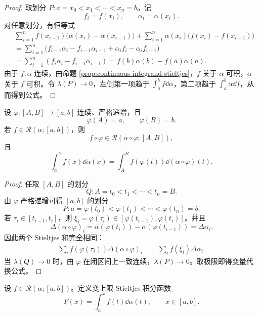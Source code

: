 \begin{proof}
	取划分 $P:a=x_0<x_1<\cdots<x_n=b$。记
	\[
	f_i=f(x_i),
	\qquad
	\alpha_i=\alpha(x_i).
	\]
	对任意划分，有恒等式
	\[
	\begin{aligned}
		&\sum_{i=1}^n f(x_{i-1})\bigl(\alpha(x_i)-\alpha(x_{i-1})\bigr)
		+\sum_{i=1}^n \alpha(x_i)\bigl(f(x_i)-f(x_{i-1})\bigr) \\
		&=\sum_{i=1}^n \bigl(f_{i-1}\alpha_i-f_{i-1}\alpha_{i-1}+\alpha_i f_i-\alpha_i f_{i-1}\bigr) \\
		&=\sum_{i=1}^n(f_i\alpha_i-f_{i-1}\alpha_{i-1})
		=f(b)\alpha(b)-f(a)\alpha(a).
	\end{aligned}
	\]
	由于 $f,\alpha$ 连续，由命题 \ref{prop:continuous-integrand-stieltjes}，$f$ 关于 $\alpha$ 可积，$\alpha$ 关于 $f$ 可积。令 $\lambda(P)\to0$，左侧第一项趋于 $\int_a^b f\dd\alpha$，第二项趋于 $\int_a^b\alpha\dd f$，从而得到公式。
\end{proof}

\begin{proposition}\label{prop:change-variable-stieltjes}
	设 $\varphi:[A,B]\to[a,b]$ 连续、严格递增，且
	\[
	\varphi(A)=a,
	\qquad
	\varphi(B)=b.
	\]
	若 $f\in\mathcal R(\alpha;[a,b])$，则
	\[
	f\circ\varphi\in\mathcal R(\alpha\circ\varphi;[A,B]),
	\]
	且
	\[
	\int_a^b f(x)\dd\alpha(x)
	=\int_A^B f(\varphi(t))\dd(\alpha\circ\varphi)(t).
	\]
\end{proposition}

\begin{proof}
	任取 $[A,B]$ 的划分
	\[
	Q:A=t_0<t_1<\cdots<t_n=B.
	\]
	由 $\varphi$ 严格递增可得 $[a,b]$ 的划分
	\[
	P:a=\varphi(t_0)<\varphi(t_1)<\cdots<\varphi(t_n)=b.
	\]
	若 $\tau_i\in[t_{i-1},t_i]$，则 $\xi_i=\varphi(\tau_i)\in[\varphi(t_{i-1}),\varphi(t_i)]$。并且
	\[
	\Delta(\alpha\circ\varphi)_i
	=\alpha(\varphi(t_i))-\alpha(\varphi(t_{i-1}))
	=\Delta\alpha_i.
	\]
	因此两个 Stieltjes 和完全相同：
	\[
	\begin{aligned}
		\sum_i f(\varphi(\tau_i))\Delta(\alpha\circ\varphi)_i
		&=\sum_i f(\xi_i)\Delta\alpha_i.
	\end{aligned}
	\]
	当 $\lambda(Q)\to0$ 时，由 $\varphi$ 在闭区间上一致连续，$\lambda(P)\to0$。取极限即得变量代换公式。
\end{proof}

\begin{definition}
	设 $f\in\mathcal R(\alpha;[a,b])$。定义变上限 Stieltjes 积分函数
	\[
	F(x)=\int_a^x f(t)\dd\alpha(t),
	\qquad x\in[a,b].
	\]
\end{definition}

